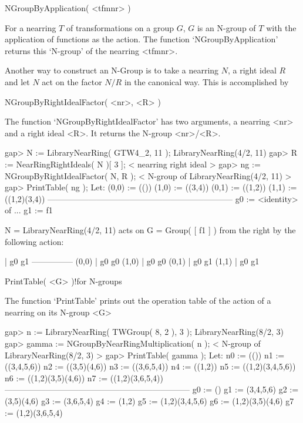 \>NGroupByApplication( <tfmnr> )

For a nearring $T$ of transformations on a group $G$, $G$ is an
N-group of $T$ with the application of functions as the action. The
function `NGroupByApplication' returns this `N-group' of the nearring
<tfmnr>.

Another way to construct an N-Group is to take a nearring $N$, a right
ideal $R$ and let $N$ act on the factor $N/R$ in the canonical way.
This is accomplished by

\>NGroupByRightIdealFactor( <nr>, <R> )

The function `NGroupByRightIdealFactor' has two arguments, a nearring
<nr> and a right ideal <R>. It returns the N-group <nr>/<R>.

\beginexample
    gap> N := LibraryNearRing( GTW4_2, 11 );
    LibraryNearRing(4/2, 11)
    gap> R := NearRingRightIdeals( N )[ 3 ];
    < nearring right ideal >
    gap> ng := NGroupByRightIdealFactor( N, R );
    < N-group of LibraryNearRing(4/2, 11) >
    gap> PrintTable( ng );
    Let:
    (0,0) := (())
    (1,0) := ((3,4))
    (0,1) := ((1,2))
    (1,1) := ((1,2)(3,4))
    --------------------------------------------------------------------
    g0 := <identity> of ...
    g1 := f1

    N = LibraryNearRing(4/2, 11) acts on 
    G = Group( [ f1 ] )
    from the right by the following action: 

             | g0  g1  
      ---------------
      (0,0)  | g0  g0  
      (1,0)  | g0  g0  
      (0,1)  | g0  g1  
      (1,1)  | g0  g1  

\endexample



\>PrintTable( <G> )!{for N-groups}

The function `PrintTable' prints out the operation table of the 
action of a nearring on its N-group <G>

\beginexample
    gap> n := LibraryNearRing( TWGroup( 8, 2 ), 3 );
    LibraryNearRing(8/2, 3)
    gap> gamma := NGroupByNearRingMultiplication( n );
    < N-group of LibraryNearRing(8/2, 3) >
    gap> PrintTable( gamma );
    Let:
    n0 := (())
    n1 := ((3,4,5,6))
    n2 := ((3,5)(4,6))
    n3 := ((3,6,5,4))
    n4 := ((1,2))
    n5 := ((1,2)(3,4,5,6))
    n6 := ((1,2)(3,5)(4,6))
    n7 := ((1,2)(3,6,5,4))
    --------------------------------------------------------------------
    g0 := ()
    g1 := (3,4,5,6)
    g2 := (3,5)(4,6)
    g3 := (3,6,5,4)
    g4 := (1,2)
    g5 := (1,2)(3,4,5,6)
    g6 := (1,2)(3,5)(4,6)
    g7 := (1,2)(3,6,5,4)

